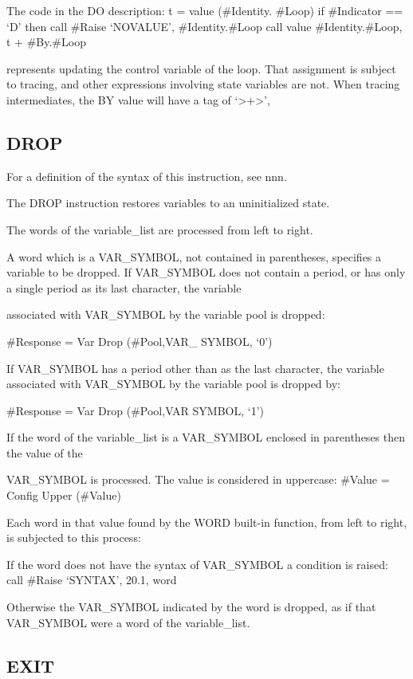 The code in the DO description: t = value (\#Identity. \#Loop) if
\#Indicator == `D' then call \#Raise `NOVALUE', \#Identity.\#Loop call
value \#Identity.\#Loop, t + \#By.\#Loop

represents updating the control variable of the loop. That assignment is
subject to tracing, and other expressions involving state variables are
not. When tracing intermediates, the BY value will have a tag of
`\textgreater+\textgreater{}',

\subsection{DROP}\label{drop}

For a definition of the syntax of this instruction, see nnn.

The DROP instruction restores variables to an uninitialized state.

The words of the variable\_list are processed from left to right.

A word which is a VAR\_SYMBOL, not contained in parentheses, specifies a
variable to be dropped. If VAR\_SYMBOL does not contain a period, or has
only a single period as its last character, the variable

associated with VAR\_SYMBOL by the variable pool is dropped:

\#Response = Var Drop (\#Pool,VAR\_ SYMBOL, `0')

If VAR\_SYMBOL has a period other than as the last character, the
variable associated with VAR\_SYMBOL by the variable pool is dropped by:

\#Response = Var Drop (\#Pool,VAR SYMBOL, `1')

If the word of the variable\_list is a VAR\_SYMBOL enclosed in
parentheses then the value of the

VAR\_SYMBOL is processed. The value is considered in uppercase: \#Value
= Config Upper (\#Value)

Each word in that value found by the WORD built-in function, from left
to right, is subjected to this process:

If the word does not have the syntax of VAR\_SYMBOL a condition is
raised: call \#Raise `SYNTAX', 20.1, word

Otherwise the VAR\_SYMBOL indicated by the word is dropped, as if that
VAR\_SYMBOL were a word of the variable\_list.

\subsection{EXIT}\label{exit}

